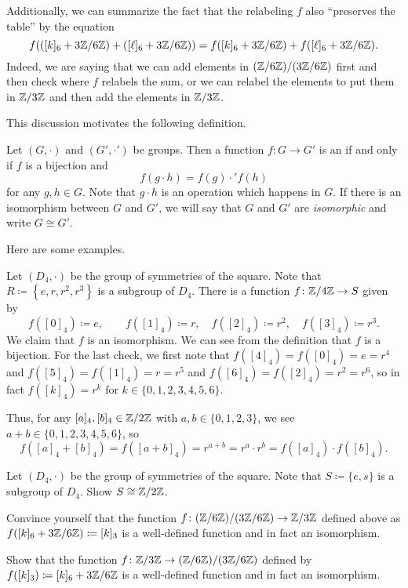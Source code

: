 \documentclass[../notes.tex]{subfiles}
\begin{document}
Additionally, we can summarize the fact that the relabeling $f$ also ``preserves the table'' by the equation
\[f(([k]_6+3\mathbb Z/6\mathbb Z)+([\ell]_6+3\mathbb Z/6\mathbb Z))=f([k]_6+3\mathbb Z/6\mathbb Z)+f([\ell]_6+3\mathbb Z/6\mathbb Z).\]
Indeed, we are saying that we can add elements in $(\mathbb Z/6\mathbb Z)/(3\mathbb Z/6\mathbb Z)$ first and then check where $f$ relabels the sum, or we can relabel the elements to put them in $\mathbb Z/3\mathbb Z$ and then add the elements in $\mathbb Z/3\mathbb Z$.

This discussion motivates the following definition.
\begin{definition}[isomorphism]
    Let $(G,\cdot)$ and $(G',\cdot')$ be groups. Then a function $f\colon G\to G'$ is an  if and only if $f$ is a bijection and
    \[f(g\cdot h)=f(g)\cdot'f(h)\]
    for any $g,h\in G$. Note that $g\cdot h$ is an operation which happens in $G$. If there is an isomorphism between $G$ and $G'$, we will say that $G$ and $G'$ are \textit{isomorphic} and write $G\cong G'$.
\end{definition}
Here are some examples.
\begin{example}
    Let $(D_4,\cdot)$ be the group of symmetries of the square. Note that $R\coloneqq\left\{e,r,r^2,r^3\right\}$ is a subgroup of $D_4$. There is a function $f\colon\mathbb Z/4\mathbb Z\to S$ given by
    \[f([0]_4)\coloneqq e,\qquad f([1]_4)\coloneqq r,\quad f([2]_4)\coloneqq r^2,\quad f([3]_4)\coloneqq r^3.\]
    We claim that $f$ is an isomorphism. We can see from the definition that $f$ is a bijection. For the last check, we first note that $f([4]_4)=f([0]_4)=e=r^4$ and $f([5]_4)=f([1]_4)=r=r^5$ and $f([6]_4)=f([2]_4)=r^2=r^6$, so in fact $f([k]_4)=r^k$ for $k\in\{0,1,2,3,4,5,6\}$.
    
    Thus, for any $[a]_4,[b]_4\in\mathbb Z/2\mathbb Z$ with $a,b\in\{0,1,2,3\}$, we see $a+b\in\{0,1,2,3,4,5,6\}$, so
    \[f([a]_4+[b]_4)=f([a+b]_4)=r^{a+b}=r^a\cdot r^b=f([a]_4)\cdot f([b]_4).\]
\end{example}
\begin{exe}
    Let $(D_4,\cdot)$ be the group of symmetries of the square. Note that $S\coloneqq\{e,s\}$ is a subgroup of $D_4$. Show $S\cong\mathbb Z/2\mathbb Z$.
\end{exe}
\begin{exe}
    Convince yourself that the function $f\colon(\mathbb Z/6\mathbb Z)/(3\mathbb Z/6\mathbb Z)\to\mathbb Z/3\mathbb Z$ defined above as $f([k]_6+3\mathbb Z/6\mathbb Z)\coloneqq[k]_3$ is a well-defined function and in fact an isomorphism.
\end{exe}
\begin{exe}
    Show that the function $f\colon\mathbb Z/3\mathbb Z\to(\mathbb Z/6\mathbb Z)/(3\mathbb Z/6\mathbb Z)$ defined by $f([k]_3)\coloneqq[k]_6+3\mathbb Z/6\mathbb Z$ is a well-defined function and in fact an isomorphism.
\end{exe}
\end{document}
